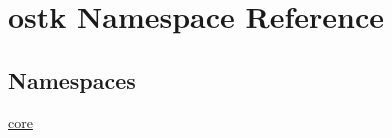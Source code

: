 \hypertarget{namespaceostk}{}\section{ostk Namespace Reference}
\label{namespaceostk}
\subsection*{Namespaces}
\begin{DoxyCompactItemize}
\item 
 \hyperlink{namespaceostk_1_1core}{core}
\end{DoxyCompactItemize}
